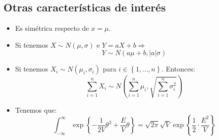 \subsection{Otras características de interés}
\begin{itemize}
    \item Es simétrica respecto de $x = \mu$.
    \item Si tenemos $X \sim N\left( \mu, \sigma \right)$ e $Y = aX + b \Rightarrow$
    \[
    Y \sim N\left( a \mu + b, \lvert a \rvert \sigma \right)
    \]
    \item Si tenemos $X_i \sim N\left( \mu_i, \sigma_i \right)$ para $i \in \left\{ 1, \ldots, n \right\}$. Entonces: 
    \[
    \sum_{i=1}^{n} X_i \sim N\left( \sum_{i=1}^{n} \mu_i, \sqrt{\sum_{i=1}^{n}
    \sigma_i^2} \right)  
    \]

\item Tenemos que:
    \[
    \int_{-\infty}^{\infty} \exp\left\{ -\frac{1}{2V}\theta^2 + \frac{E}{V} \theta \right\} = \sqrt{2 \pi} \sqrt{V} \exp\left\{ \frac{1}{2} \cdot \frac{E^2}{V} \right\}
    \]
\end{itemize}
